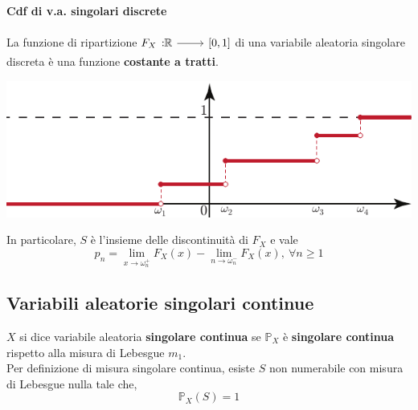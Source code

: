 \paragraph{Cdf di v.a. singolari discrete}
La funzione di ripartizione $\funz{F_X}{\realset}{\left[0,1\right]}$ di una variabile aleatoria singolare discreta è una funzione \textbf{costante a tratti}.
\begin{center}
	\includegraphics[width=0.4\paperwidth]{images/vadiscreta}
\end{center}
In particolare, $S$ è l'insieme delle discontinuità di $F_X$ e vale
\begin{equation}
	p_n=\lim_{x\to\omega_n^{+}}F_X(x)-\lim_{n\to\omega_n^{-}}F_X(x),\ \forall n\geq 1
\end{equation}
\subsection{Variabili aleatorie singolari continue}
\begin{define}
	$X$ si dice variabile aleatoria \textbf{singolare continua} se $\mathbb{P}_X$ è \textbf{singolare continua} rispetto alla misura di Lebesgue $m_1$.\\
	Per definizione di misura singolare continua, esiste $S$ non numerabile con misura di Lebesgue nulla tale che,
	\begin{equation}
		\mathbb{P}_X\left(S\right)=1
	\end{equation}
\end{define}
